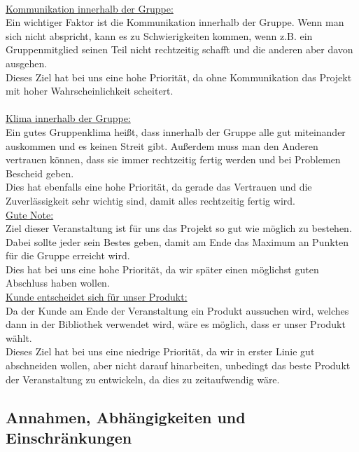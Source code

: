 \documentclass[fontsize=12pt,paper=a4,twoside]{scrartcl}
\begin{document}
\bigskip \\
\underline{Kommunikation innerhalb der Gruppe:} \\
Ein wichtiger Faktor ist die Kommunikation innerhalb der Gruppe. Wenn man sich nicht abspricht, kann es zu Schwierigkeiten kommen, wenn z.B. ein Gruppenmitglied seinen Teil nicht rechtzeitig schafft und die anderen aber davon ausgehen.\\
Dieses Ziel hat bei uns eine hohe Priorität, da ohne Kommunikation das Projekt mit hoher Wahrscheinlichkeit scheitert.\\
\bigskip \\
\underline{Klima innerhalb der Gruppe:} \\
Ein gutes Gruppenklima heißt, dass innerhalb der Gruppe alle gut miteinander auskommen und es keinen Streit gibt. Außerdem muss man den Anderen vertrauen können, dass sie immer rechtzeitig fertig werden und bei Problemen Bescheid geben.\\
Dies hat ebenfalls eine hohe Priorität, da gerade das Vertrauen und die Zuverlässigkeit sehr wichtig sind, damit alles rechtzeitig fertig wird.
\bigskip \\
\underline{Gute Note:}\\
Ziel dieser Veranstaltung ist für uns das Projekt so gut wie möglich zu bestehen. Dabei sollte jeder sein Bestes geben, damit am Ende das Maximum an Punkten für die Gruppe erreicht wird.\\
Dies hat bei uns eine hohe Priorität, da wir später einen möglichst guten Abschluss haben wollen.
\bigskip \\
\underline{Kunde entscheidet sich für unser Produkt:}\\
Da der Kunde am Ende der Veranstaltung ein Produkt aussuchen wird, welches dann in der Bibliothek verwendet wird, wäre es möglich, dass er unser Produkt wählt.\\
Dieses Ziel hat bei uns eine niedrige Priorität, da wir in erster Linie gut abschneiden wollen, aber nicht darauf hinarbeiten, unbedingt das beste Produkt der Veranstaltung zu entwickeln, da dies zu zeitaufwendig wäre.


\subsection{Annahmen, Abhängigkeiten und Einschränkungen}
\end{document}
